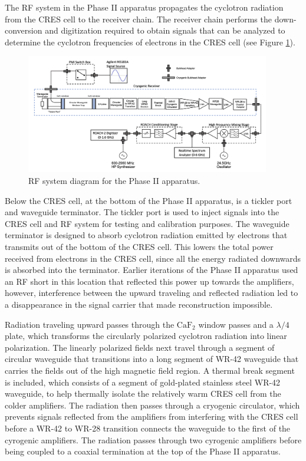 The RF system in the Phase II apparatus propagates the cyclotron radiation from the CRES cell to the receiver chain. The receiver chain performs the down-conversion and digitization required to obtain signals that can be analyzed to determine the cyclotron frequencies of electrons in the CRES cell (see Figure \ref{fig:chap3-phase2-rf-chain}).
\begin{figure}[htbp]
    \centering
    \includegraphics*[width=0.95\textwidth]{figs/Chapter-3/230620_phase2_rf_chain.png}
    \caption{\label{fig:chap3-phase2-rf-chain} RF system diagram for the Phase II apparatus.}
\end{figure}

Below the CRES cell, at the bottom of the Phase II apparatus, is a tickler port and waveguide terminator. The tickler port is used to inject signals into the CRES cell and RF system for testing and calibration purposes. The waveguide terminator is designed to absorb cyclotron radiation emitted by electrons that transmits out of the bottom of the CRES cell. This lowers the total power received from electrons in the CRES cell, since all the energy radiated downwards is absorbed into the terminator. Earlier iterations of the Phase II apparatus used an RF short in this location that reflected this power up towards the amplifiers, however, interference between the upward traveling and reflected radiation led to a disappearance in the signal carrier that made reconstruction impossible.

Radiation traveling upward passes through the $\mathrm{CaF}_2$ window passes and a $\lambda/4$ plate, which transforms the circularly polarized cyclotron radiation into linear polarization. The linearly polarized fields next travel through a segment of circular waveguide that transitions into a long segment of WR-42 waveguide that carries the fields out of the high magnetic field region. A thermal break segment is included, which consists of a segment of gold-plated stainless steel WR-42 waveguide, to help thermally isolate the relatively warm CRES cell from the colder amplifiers. The radiation then passes through a cryogenic circulator, which prevents signals reflected from the amplifiers from interfering with the CRES cell before a WR-42 to WR-28 transition connects the waveguide to the first of the cyrogenic amplifiers. The radiation passes through two cyrogenic amplifiers before being coupled to a coaxial termination at the top of the Phase II apparatus.

